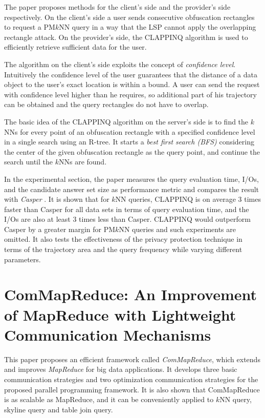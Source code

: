 \documentclass[paper=a4, fontsize=18pt]{article} %
\numberwithin{equation}{section} %
\numberwithin{figure}{section} %
\numberwithin{table}{section} %
\begin{document}
The paper proposes methods for the client's side and the provider's side respectively. On the client's side a user sends consecutive obfuscation rectangles to request a PM$k$NN query in a way that the LSP cannot apply the overlapping rectangle attack. On the provider's side, the CLAPPINQ algorithm is used to efficiently retrieve sufficient data for the user.

The algorithm on the client's side exploits the concept of \emph{confidence level}. Intuitively the confidence level of the user guarantees that the distance of a data object to the user's exact location is within a bound. A user can send the request with confidence level higher than he requires, so additional part of his trajectory can be obtained and the query rectangles do not have to overlap.

The basic idea of the CLAPPINQ algorithm on the server's side is to find the $k$NNs for every point of an obfuscation rectangle with a specified confidence level in a single search using an R-tree. It starts a \emph{best first search (BFS)} considering the center of the given obfuscation rectangle as the query point, and continue the search until the $k$NNs are found.

In the experimental section, the paper measures the query evaluation time, I/Os, and the candidate answer set size as performance metric and compares the result with \emph{Casper} \cite{MCA06}. It is shown that for $k$NN queries, CLAPPINQ is on average 3 times faster than Casper for all data sets in terms of query evaluation time, and the I/Os are also at least 3 times less than Casper. CLAPPINQ would outperform Casper by a greater margin for PM$k$NN queries and such experiments are omitted. It also tests the effectiveness of the privacy protection technique in terms of the trajectory area and the query frequency while varying different parameters.


\section{ComMapReduce: An Improvement of MapReduce with Lightweight Communication Mechanisms \cite{DWXWHZ13}}

This paper proposes an efficient framework called \emph{ComMapReduce}, which extends and improves \emph{MapReduce} for big data applications. It develops three basic communication strategies and two optimization communication strategies for the proposed parallel programming framework. It is also shown that ComMapReduce is as scalable as MapReduce, and it can be conveniently applied to $k$NN query, skyline query and table join query.
\end{document}
